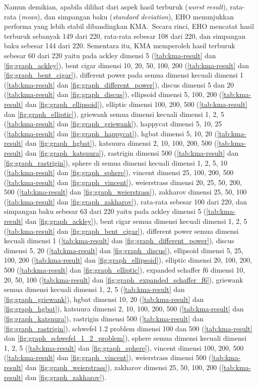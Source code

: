 Namun demikian, apabila dilihat dari aspek hasil terburuk (\textit{worst result}), rata-rata (\textit{mean}), dan simpangan baku (\textit{standard deviation}), EHO menunjukkan performa yang lebih stabil dibandingkan KMA.\ Secara rinci, EHO mencatat hasil terburuk sebanyak 149 dari 220, rata-rata sebesar 108 dari 220, dan simpangan baku sebesar 144 dari 220. Sementara itu, KMA memperoleh hasil terburuk sebesar 60 dari 220 yaitu pada ackley dimensi 5 (\cref{tab:kma-result} dan \cref{fig:graph_ackley}), bent cigar dimensi 10, 20, 50, 100, 200 (\cref{tab:kma-result} dan \cref{fig:graph_bent_cigar}), different power pada semua dimensi kecuali dimensi 1 (\cref{tab:kma-result} dan \cref{fig:graph_different_power}), discus dimensi 5 dan 20 (\cref{tab:kma-result} dan \cref{fig:graph_discus}), ellipsoid dimensi 5, 100, 200 (\cref{tab:kma-result} dan \cref{fig:graph_ellipsoid}), elliptic dimensi 100, 200, 500 (\cref{tab:kma-result} dan \cref{fig:graph_elliptic}), griewank semua dimensi kecuali dimensi 1, 2, 5 (\cref{tab:kma-result} dan \cref{fig:graph_griewank}), happycat dimensi 5, 10, 25 (\cref{tab:kma-result} dan \cref{fig:graph_happycat}), hgbat dimensi 5, 10, 20 (\cref{tab:kma-result} dan \cref{fig:graph_hgbat}), katsuura dimensi 2, 10, 100, 200, 500 (\cref{tab:kma-result} dan \cref{fig:graph_katsuura}), rastrigin dimensi 500 (\cref{tab:kma-result} dan \cref{fig:graph_rastrigin}), sphere di semua dimensi kecuali dimensi 1, 2, 5, 10 (\cref{tab:kma-result} dan \cref{fig:graph_sphere}), vincent dimensi 25, 100, 200, 500 (\cref{tab:kma-result} dan \cref{fig:graph_vincent}), weierstrass dimensi 20, 25, 50, 200, 500 (\cref{tab:kma-result} dan \cref{fig:graph_weierstrass}), zakharov dimensi 25, 50, 100 (\cref{tab:kma-result} dan \cref{fig:graph_zakharov}), rata-rata sebesar 100 dari 220, dan simpangan baku sebesar 63 dari 220 yaitu pada ackley dimensi 5 (\cref{tab:kma-result} dan \cref{fig:graph_ackley}), bent cigar semua dimensi kecuali dimensi 1, 2, 5 (\cref{tab:kma-result} dan \cref{fig:graph_bent_cigar}), different power semua dimensi kecuali dimensi 1 (\cref{tab:kma-result} dan \cref{fig:graph_different_power}), discus dimensi 5, 20 (\cref{tab:kma-result} dan \cref{fig:graph_discus}), ellipsoid dimensi 5, 25, 100, 200 (\cref{tab:kma-result} dan \cref{fig:graph_ellipsoid}), elliptic dimensi 20, 100, 200, 500 (\cref{tab:kma-result} dan \cref{fig:graph_elliptic}), expanded schaffer f6 dimensi 10, 20, 50, 100 (\cref{tab:kma-result} dan \cref{fig:graph_expanded_schaffer_f6}), griewank semua dimensi kecuali dimensi 1, 2, 5 (\cref{tab:kma-result} dan \cref{fig:graph_griewank}), hgbat dimensi 10, 20 (\cref{tab:kma-result} dan \cref{fig:graph_hgbat}), katsuura dimensi 2, 10, 100, 200, 500 (\cref{tab:kma-result} dan \cref{fig:graph_katsuura}), rastrigin dimensi 500 (\cref{tab:kma-result} dan \cref{fig:graph_rastrigin}), schwefel 1.2 problem dimensi 100 dan 500 (\cref{tab:kma-result} dan \cref{fig:graph_schwefel_1_2_problem}), sphere semua dimensi kecuali dimensi 1, 2, 5 (\cref{tab:kma-result} dan \cref{fig:graph_sphere}), vincent dimensi 100, 200, 500 (\cref{tab:kma-result} dan \cref{fig:graph_vincent}), weierstrass dimensi 500 (\cref{tab:kma-result} dan \cref{fig:graph_weierstrass}), zakharov dimensi 25, 50, 100, 200 (\cref{tab:kma-result} dan \cref{fig:graph_zakharov}).

